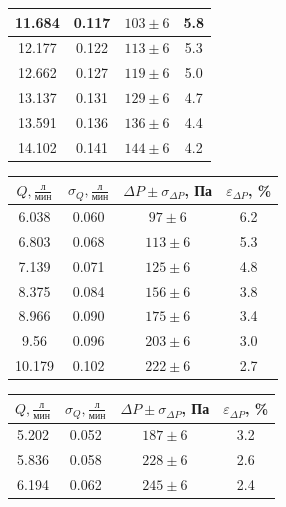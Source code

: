 \documentclass[a4paper]{article}
\begin{document}
\begin{enumerate}
\begin{multicols}{2}
\begin{center}
\begin{tabular}{|c|c|c|c|}
        11.684 & 0.117 & $103 \pm 6$ & 5.8 \\ \hline
        12.177 & 0.122 & $113 \pm 6$ & 5.3 \\ \hline
        12.662 & 0.127 & $119 \pm 6$ & 5.0 \\ \hline
        13.137 & 0.131 & $129 \pm 6$ & 4.7 \\ \hline
        13.591 & 0.136 & $136 \pm 6$ & 4.4 \\ \hline
        14.102 & 0.141 & $144 \pm 6$ & 4.2 \\ \hline
    \end{tabular}
\end{center}
\vspace{1em}
\begin{center}
    \begin{tabular}{|c|c|c|c|}
        \hline
        $Q, \frac{\text{л}}{\text{мин}}$ & $\sigma_Q, \frac{\text{л}}{\text{мин}}$ & $\Delta P \pm \sigma_{\Delta P}$, Па & $\varepsilon_{\Delta P}$, \% \\
        \hline
        6.038 & 0.060 & $97 \pm 6$ & 6.2 \\ \hline
        6.803 & 0.068 & $113 \pm 6$ & 5.3 \\ \hline
        7.139 & 0.071 & $125 \pm 6$ & 4.8 \\ \hline
        8.375 & 0.084 & $156 \pm 6$ & 3.8 \\ \hline
        8.966 & 0.090 & $175 \pm 6$ & 3.4 \\ \hline
        9.56 & 0.096 & $203 \pm 6$ & 3.0 \\ \hline
        10.179 & 0.102 & $222 \pm 6$ & 2.7 \\ \hline
    \end{tabular}
\end{center}
\vspace{1em}
\begin{center}
    \begin{tabular}{|c|c|c|c|}
        \hline
        $Q, \frac{\text{л}}{\text{мин}}$ & $\sigma_Q, \frac{\text{л}}{\text{мин}}$ & $\Delta P \pm \sigma_{\Delta P}$, Па & $\varepsilon_{\Delta P}$, \% \\
        \hline
        5.202 & 0.052 & $187 \pm 6$ & 3.2 \\ \hline
        5.836 & 0.058 & $228 \pm 6$ & 2.6 \\ \hline
        6.194 & 0.062 & $245 \pm 6$ & 2.4 \\ \hline

\end{tabular}
\end{center}
\end{multicols}
\end{enumerate}
\end{document}
